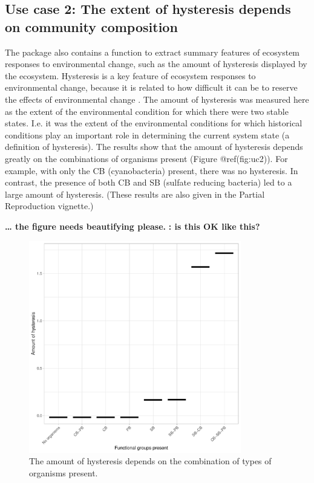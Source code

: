 \documentclass[]{elsarticle} %
\begin{document}
\hypertarget{use-case-2-the-extent-of-hysteresis-depends-on-community-composition}{%
\subsection{Use case 2: The extent of hysteresis depends on community
composition}\label{use-case-2-the-extent-of-hysteresis-depends-on-community-composition}}

The package also contains a function to extract summary features of
ecosystem responses to environmental change, such as the amount of
hysteresis displayed by the ecosystem. Hysteresis is a key feature of
ecosystem responses to environmental change, because it is related to
how difficult it can be to reserve the effects of environmental change
\citep{Scheffer2001}. The amount of hysteresis was measured here as the
extent of the environmental condition for which there were two stable
states. I.e. it was the extent of the environmental conditions for which
historical conditions play an important role in determining the current
system state (a definition of hysteresis). The results show that the
amount of hysteresis depends greatly on the combinations of organisms
present (Figure @ref(fig:uc2)). For example, with only the CB
(cyanobacteria) present, there was no hysteresis. In contrast, the
presence of both CB and SB (sulfate reducing bacteria) led to a large
amount of hysteresis. (These results are also given in the Partial
Reproduction vignette.)

\textbf{\citet{Rainer}\ldots{} the figure needs beautifying please.}
\textbf{\citet{Owen}: is this OK like this?}

\begin{figure}

{\centering \includegraphics[width=350px]{./figures/gen_uc2_user_guide_hysteresis} 

}

\caption{The amount of hysteresis depends on the combination of types of organisms present.}\label{fig:uc2}
\end{figure}
\end{document}
